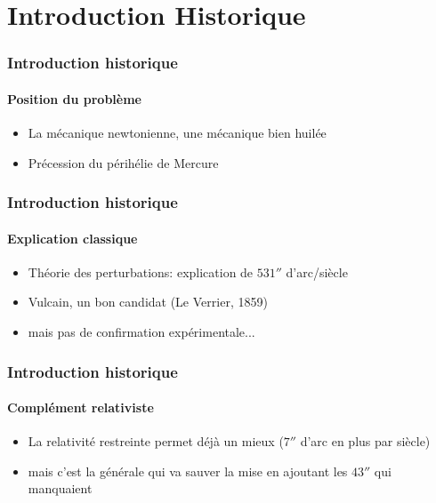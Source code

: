 \section{Introduction Historique}

\begin{frame}
\frametitle{Introduction historique}
\framesubtitle{Position du problème}

\begin{itemize}
	\item	<1->	La mécanique newtonienne, une mécanique bien huilée
	\item	<2->	Précession du périhélie de Mercure
	
	
\end{itemize}

\end{frame}


\begin{frame}
\frametitle{Introduction historique}
\framesubtitle{Explication classique}

\begin{itemize}
	\item	<1->	Théorie des perturbations: explication de $531''$ d'arc/siècle
	\item	<2->	Vulcain, un bon candidat (Le Verrier, 1859)
	\item	<3->	mais pas de confirmation expérimentale...
	
\end{itemize}

\end{frame}


\begin{frame}
\frametitle{Introduction historique}
\framesubtitle{Complément relativiste}

\begin{itemize}
	\item	<1->	La relativité restreinte permet déjà un mieux ($7''$ d'arc 
	en plus par siècle)

	\item	<2->	mais c'est la générale qui va sauver la mise en ajoutant 
	les $43''$ qui manquaient
	
\end{itemize}

\end{frame}
